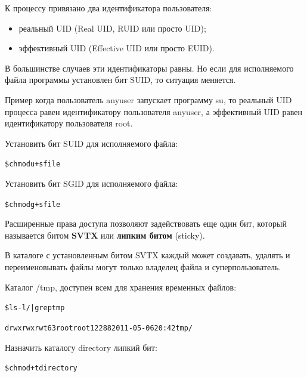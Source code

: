 \documentclass[xcolor=table]{beamer}
\begin{document}
\begin{frame}[fragile]
	К процессу привязано два идентификатора пользователя:
	\begin{itemize}
		\item реальный UID (Real UID, RUID или просто UID);
		\item эффективный UID (Effective UID или просто EUID).
	\end{itemize}
	В большинстве случаев эти идентификаторы равны. Но если для исполняемого файла программы установлен бит SUID, то ситуация меняется. 
	\begin{block}{Пример}
		когда пользователь anyuser запускает программу su, то реальный UID процесса равен идентификатору пользователя anyuser, а эффективный UID  равен идентификатору пользователя root.
	\end{block}
	\begin{block}{Установить бит SUID для исполняемого файла:}
		\begin{alltt}
			\$ chmod u+s file
		\end{alltt}
	\end{block}
	\begin{block}{Установить бит SGID для исполняемого файла:}
		\begin{alltt}
			\$ chmod g+s file
		\end{alltt}
	\end{block}
\end{frame}

\begin{frame}[fragile]
	Расширенные права доступа позволяют задействовать еще один бит, который называется битом \textbf{SVTX} или \textbf{липким битом} (sticky). 
	
	В каталоге с установленным битом SVTX каждый может создавать, удалять и переименовывать файлы могут только владелец файла и суперпользователь.  
	\begin{block}{Каталог /tmp, доступен всем для хранения временных файлов:}
		\begin{alltt}
			\$ ls -l / | grep tmp

			drwxrwxrwt 63 root root 12288 2011-05-06 20:42 tmp/
		\end{alltt}
	\end{block}
	\begin{block}{Назначить каталогу directory липкий бит:}
		\begin{alltt}
			\$ chmod +t directory
		\end{alltt}
	\end{block}
\end{frame}
\end{document}
